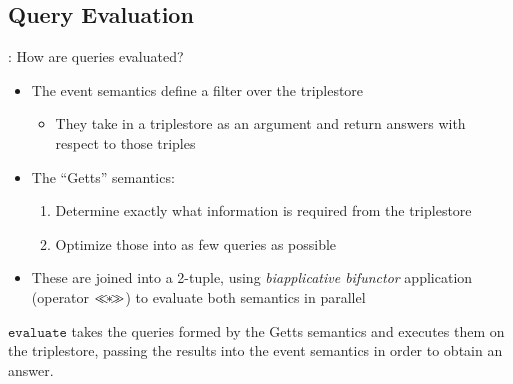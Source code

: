 \documentclass[logoontitle,tabu,supertabular,aspectratio=43]{preney-uwindsor-beamer}
\begin{document}
    \subsection{Query Evaluation}
    \begin{frame}{\insertsection: \insertsubsection}
        How are queries evaluated?
        \begin{itemize}
            \item The event semantics define a filter over the triplestore
            \begin{itemize}
                \item They take in a triplestore as an argument and return answers with respect to those triples
            \end{itemize}
            \item The ``Getts'' semantics:
            \begin{enumerate}
                \item Determine exactly what information is required from the triplestore%
                \item Optimize those into as few queries as possible
            \end{enumerate}
            \item These are joined into a 2-tuple, using {\em biapplicative bifunctor} application (operator $\mathbin{\ll\mkern-8mu*\mkern-8mu\gg}$) to evaluate both semantics in parallel
        \end{itemize}
        \begin{block}{}
            $\mathtt{evaluate}$ takes the queries formed by the Getts semantics and executes them on the triplestore, passing the results into the event semantics in order to obtain an answer.
        \end{block}
    \end{frame}
\end{document}
